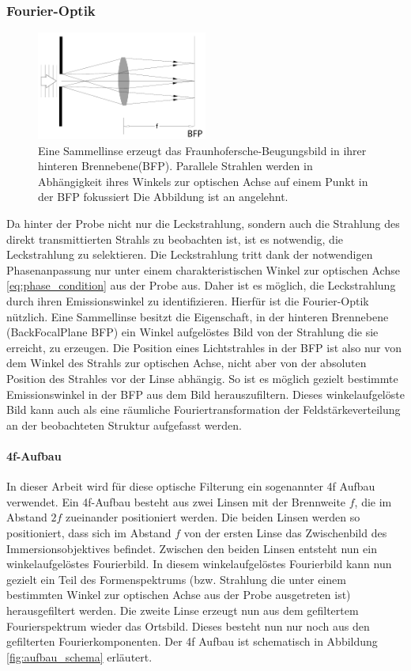 \documentclass[titlepage]{article}
\begin{document}
	\subsubsection{Fourier-Optik}
		\begin{figure}[htbp] 
		\centering
		\includegraphics[width=0.5\textwidth]{figures/FourierLinse.pdf}
		\caption{Eine Sammellinse erzeugt das Fraunhofersche-Beugungsbild in ihrer hinteren Brennebene(BFP). Parallele Strahlen werden in Abhängigkeit ihres Winkels zur optischen Achse auf einem Punkt in der BFP fokussiert Die Abbildung ist an \cite{Hecht.2018} angelehnt.}
		\label{fig:FourierLinse}
	\end{figure}
	Da hinter der Probe nicht nur die Leckstrahlung, sondern auch die Strahlung des direkt transmittierten Strahls zu beobachten ist, ist es notwendig, die Leckstrahlung zu selektieren. Die Leckstrahlung tritt dank der notwendigen Phasenanpassung nur unter einem charakteristischen Winkel zur optischen Achse \eqref{eq:phase_condition} aus der Probe aus. Daher ist es möglich, die Leckstrahlung durch ihren Emissionswinkel zu identifizieren. Hierfür ist die Fourier-Optik nützlich. Eine Sammellinse besitzt die Eigenschaft, in  der hinteren Brennebene (BackFocalPlane BFP) ein Winkel aufgelöstes Bild von der Strahlung die sie erreicht, zu erzeugen.\cite{Hecht.1996} Die Position eines Lichtstrahles in der BFP ist also nur von dem Winkel des Strahls zur optischen Achse, nicht aber von der absoluten Position des Strahles vor der Linse abhängig. So ist es möglich gezielt bestimmte Emissionswinkel in der BFP aus dem Bild herauszufiltern. Dieses winkelaufgelöste Bild kann auch als eine räumliche Fouriertransformation der Feldstärkeverteilung an der beobachteten Struktur aufgefasst werden. 
	
	\paragraph{4f-Aufbau}
		In dieser Arbeit wird für diese optische Filterung ein sogenannter 4f Aufbau verwendet. Ein 4f-Aufbau besteht aus zwei Linsen mit der Brennweite $f$, die im Abstand $2f$ zueinander positioniert werden. Die beiden Linsen werden so positioniert, dass sich im Abstand $f$ von der ersten Linse das Zwischenbild des Immersionsobjektives befindet. Zwischen den beiden Linsen entsteht nun ein winkelaufgelöstes Fourierbild. In diesem winkelaufgelöstes Fourierbild kann nun gezielt ein Teil des Formenspektrums (bzw. Strahlung die unter einem bestimmten Winkel zur optischen Achse aus der Probe ausgetreten ist) herausgefiltert werden. Die zweite Linse erzeugt nun aus dem gefiltertem Fourierspektrum wieder das Ortsbild. Dieses besteht nun nur noch aus den gefilterten Fourierkomponenten. Der 4f Aufbau ist schematisch in Abbildung \ref{fig:aufbau_schema} erläutert.
\end{document}
